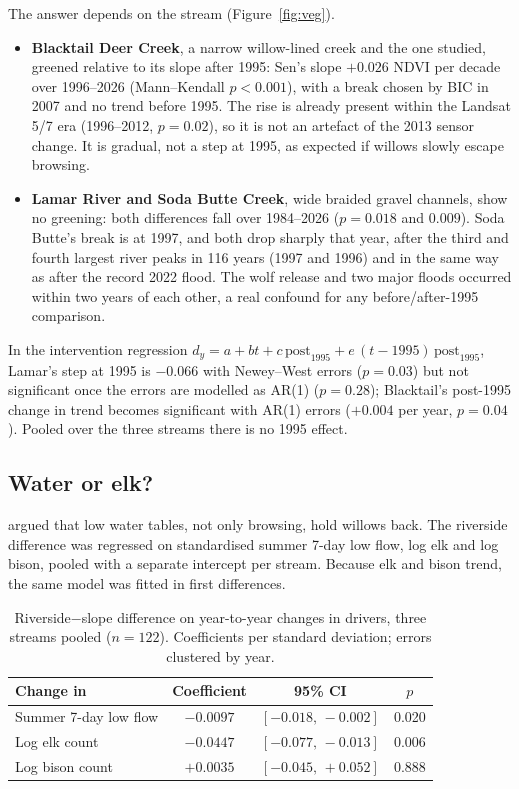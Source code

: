 \documentclass[11pt,a4paper]{article}
\begin{document}
The answer depends on the stream (Figure~\ref{fig:veg}).
\begin{itemize}
\item \textbf{Blacktail Deer Creek}, a narrow willow-lined creek and the one \citet{ripple2012} studied, greened relative to its slope after 1995: Sen's slope $+0.026$ NDVI per decade over 1996--2026 (Mann--Kendall $p<0.001$), with a break chosen by BIC in 2007 and no trend before 1995. The rise is already present within the Landsat 5/7 era (1996--2012, $p=0.02$), so it is not an artefact of the 2013 sensor change. It is gradual, not a step at 1995, as expected if willows slowly escape browsing.
\item \textbf{Lamar River and Soda Butte Creek}, wide braided gravel channels, show no greening: both differences fall over 1984--2026 ($p=0.018$ and $0.009$). Soda Butte's break is at 1997, and both drop sharply that year, after the third and fourth largest river peaks in 116 years (1997 and 1996) and in the same way as after the record 2022 flood. The wolf release and two major floods occurred within two years of each other, a real confound for any before/after-1995 comparison.
\end{itemize}
In the intervention regression $d_y=a+bt+c\,\mathrm{post}_{1995}+e\,(t-1995)\,\mathrm{post}_{1995}$, Lamar's step at 1995 is $-0.066$ with Newey--West errors ($p=0.03$) but not significant once the errors are modelled as AR(1) ($p=0.28$); Blacktail's post-1995 change in trend becomes significant with AR(1) errors ($+0.004$ per year, $p=0.04$). Pooled over the three streams there is no 1995 effect.

\subsection{Water or elk?}
\citet{marshall2013} argued that low water tables, not only browsing, hold willows back. The riverside difference was regressed on standardised summer 7-day low flow, log elk and log bison, pooled with a separate intercept per stream. Because elk and bison trend, the same model was fitted in first differences.

\begin{table}[H]
\centering\small
\caption{Riverside$-$slope difference on year-to-year changes in drivers, three streams pooled ($n=122$). Coefficients per standard deviation; errors clustered by year.}\label{tab:fd}
\begin{tabular}{@{}lccc@{}}
\toprule
Change in & Coefficient & 95\% CI & $p$ \\
\midrule
Summer 7-day low flow & $-0.0097$ & $[-0.018,\,-0.002]$ & 0.020 \\
Log elk count & $-0.0447$ & $[-0.077,\,-0.013]$ & 0.006 \\
Log bison count & $+0.0035$ & $[-0.045,\,+0.052]$ & 0.888 \\
\bottomrule
\end{tabular}
\end{table}
\end{document}
